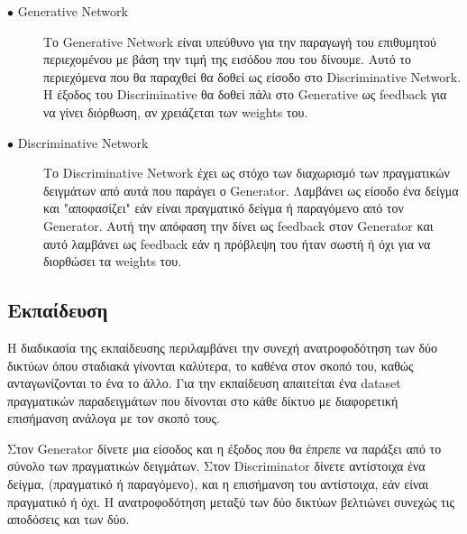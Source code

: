 \begin{description}

\item[$\bullet$ Generative Network] Το Generative Network είναι υπεύθυνο για την παραγωγή του επιθυμητού περιεχομένου με βάση την τιμή της εισόδου που του δίνουμε. Αυτό το περιεχόμενα που θα παραχθεί θα δοθεί ως είσοδο στο Discriminative Network. H έξοδος του Discriminative θα δοθεί πάλι στο Generative ως feedback για να γίνει διόρθωση, αν χρειάζεται των weights του.

\item[$\bullet$ Discriminative Network] Το Discriminative Network έχει ως στόχο των διαχωρισμό των πραγματικών δειγμάτων από αυτά που παράγει ο Generator. Λαμβάνει ως είσοδο ένα δείγμα και "αποφασίζει" εάν είναι πραγματικό δείγμα ή παραγόμενο από τον Generator. Αυτή την απόφαση την δίνει ως feedback στον Generator και αυτό λαμβάνει ως feedback εάν η πρόβλεψη του ήταν σωστή ή όχι για να διορθώσει τα weights του.

\end{description}

\subsection{Εκπαίδευση}
H διαδικασία της εκπαίδευσης περιλαμβάνει την συνεχή ανατροφοδότηση των δύο δικτύων όπου σταδιακά γίνονται καλύτερα, το καθένα στον σκοπό του, καθώς ανταγωνίζονται το ένα το άλλο. Για την εκπαίδευση απαιτείται ένα dataset πραγματικών παραδειγμάτων που δίνονται στο κάθε δίκτυο με διαφορετική επισήμανση ανάλογα με τον σκοπό τους.
\par
Στον Generator δίνετε μια είσοδος και η έξοδος που θα έπρεπε να παράξει από το σύνολο των πραγματικών δειγμάτων. Στον Discriminator δίνετε αντίστοιχα ένα δείγμα, (πραγματικό ή παραγόμενο), και η επισήμανση του αντίστοιχα, εάν είναι πραγματικό ή όχι. Η ανατροφοδότηση μεταξύ των δύο δικτύων βελτιώνει συνεχώς τις αποδόσεις και των δύο.


